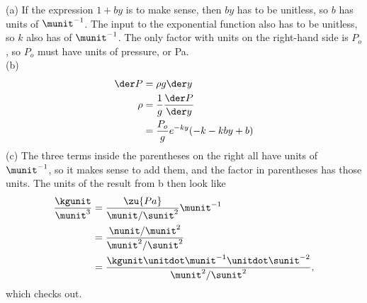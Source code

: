 (a) If the expression $1+by$ is to make sense, then $by$ has to be unitless, so $b$ has units of $\munit^{-1}$.
The input to the exponential function also has to be unitless, so $k$ also has of $\munit^{-1}$.
The only factor with units on the right-hand side is $P_o$, so $P_o$ must have units of pressure, or Pa.\\
(b)
\begin{align*}
  \der P &= \rho g \der y \\
  \rho &= \frac{1}{g} \frac{\der P}{\der y} \\
    &= \frac{P_o}{g} e^{-ky}(-k-kby+b)
\end{align*}
(c) The three terms inside the parentheses on the right all have units of $\munit^{-1}$, so it makes sense
to add them, and the factor in parentheses has those units. The units of the result from b then look like
\begin{align*}
  \frac{\kgunit}{\munit^3} &= \frac{\zu{Pa}}{\munit/\sunit^2}\munit^{-1} \\
                           &= \frac{\nunit/\munit^2}{\munit^2/\sunit^2} \\
                           &= \frac{\kgunit\unitdot\munit^{-1}\unitdot\sunit^{-2}}{\munit^2/\sunit^2},
\end{align*}
which checks out.
